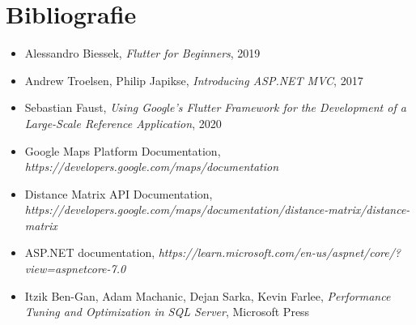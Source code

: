 \chapter*{Bibliografie} 

\begin{itemize}
    \item Alessandro Biessek, \textit{Flutter for Beginners}, 2019
    \item Andrew Troelsen, Philip Japikse, \textit{Introducing ASP.NET MVC}, 2017
    \item Sebastian Faust, \textit{Using Google's Flutter Framework for the Development of a Large-Scale Reference Application}, 2020
    \item Google Maps Platform Documentation, \textit{https://developers.google.com/maps/documentation}
    \item Distance Matrix API Documentation, \textit{https://developers.google.com/maps/documentation/distance-matrix/distance-matrix}
    \item ASP.NET documentation, \textit{https://learn.microsoft.com/en-us/aspnet/core/?view=aspnetcore-7.0}
    \item Itzik Ben-Gan, Adam Machanic, Dejan Sarka, Kevin Farlee, \textit{Performance Tuning and Optimization in SQL Server}, Microsoft Press
\end{itemize}